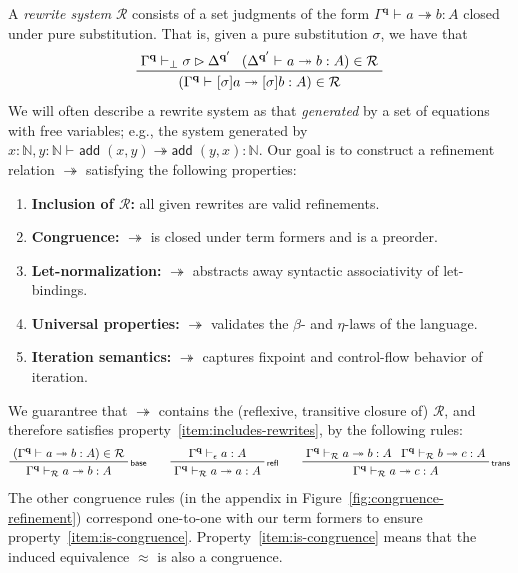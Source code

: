 \documentclass[acmsmall,screen,anonymous,review]{acmart}
\newcommand{\mc}[1]{\ensuremath{\mathcal{#1}}}
\newcommand{\mb}[1]{\ensuremath{\mathbf{#1}}}
\newcommand{\ms}[1]{\ensuremath{\mathsf{#1}}}
\newcommand{\nats}{\mathbb{N}}
\newcommand{\rle}[1]{{\scriptsize\textsf{#1}}}
\newcommand{\hasty}[4]{#1 \vdash_{#2} #3: {#4}}
\newcommand{\issubst}[4]{#1 \vdash_{#2} #3 \rhd #4}
\newcommand{\tref}{\twoheadrightarrow}
\newcommand{\tmle}[5]{#1 \vdash_{#2} #3 \tref #4 : {#5}}
\begin{document}
A \emph{rewrite system} $\mc{R}$ consists of a set judgments of the form
$\tmle{\Gamma^{\mb{q}}}{}{a}{b}{A}$ closed under pure substitution. That is, given a pure
substitution $\sigma$, we have that
\begin{equation*}
  \prftree[r]{}
    {\issubst{\Gamma^{\mb{q}}}{\bot}{\sigma}{\Delta^{\mb{q}'}}}
    {(\tmle{\Delta^{\mb{q}'}}{}{a}{b}{A}) \in \mc{R}}
    {(\tmle{\Gamma^{\mb{q}}}{}{[\sigma]a}{[\sigma]b}{A}) \in \mc{R}} 
\end{equation*}
We will often describe a rewrite system as that \emph{generated} by a set of equations with free
variables; e.g., the system generated by $\tmle{x : \nats, y : \nats}{}{\ms{add}\;(x,
y)}{\ms{add}\;(y, x)}{\nats}$. Our goal is to construct a refinement relation $\tref$ satisfying the following properties: 
\begin{enumerate}
  \item \textbf{Inclusion of $\mc{R}$:} all given rewrites are valid refinements.
  \label{item:includes-rewrites}
  \item \textbf{Congruence:} $\tref$ is closed under term formers and is a preorder.
  \label{item:is-congruence}
  \item \textbf{Let-normalization:} $\tref$ abstracts away syntactic associativity of let-bindings.
  \label{item:abstracts-syntax}
  \item \textbf{Universal properties:} $\tref$ validates the $\beta$- and $\eta$-laws of the
  language. %
  \label{item:does-computation}
  \item \textbf{Iteration semantics:} $\tref$ captures fixpoint and control-flow behavior of
  iteration.
  \label{item:does-iteration}
\end{enumerate}
We guarantree that $\tref$ contains the (reflexive, transitive closure of) $\mc{R}$, and therefore
satisfies property~\ref{item:includes-rewrites}, by the following rules:
\begin{gather*}
  \prftree[r]{\rle{base}}
    {(\tmle{\Gamma^{\mb{q}}}{}{a}{b}{A}) \in \mc{R}}
    {\tmle{\Gamma^{\mb{q}}}{\mc{R}}{a}{b}{A}} \qquad
  \prftree[r]{\rle{refl}}
    {\hasty{\Gamma^{\mb{q}}}{\epsilon}{a}{A}}
    {\tmle{\Gamma^{\mb{q}}}{\mc{R}}{a}{a}{A}}
  \qquad
  \prftree[r]{\rle{trans}}
    {\tmle{\Gamma^{\mb{q}}}{\mc{R}}{a}{b}{A}}
    {\tmle{\Gamma^{\mb{q}}}{\mc{R}}{b}{c}{A}}
    {\tmle{\Gamma^{\mb{q}}}{\mc{R}}{a}{c}{A}}
\end{gather*}
The other congruence rules (in the appendix in Figure~\ref{fig:congruence-refinement})
correspond one-to-one with our term formers to ensure property~\ref{item:is-congruence}. Property~\ref{item:is-congruence} means that the induced equivalence $\approx$ is also a congruence.
\end{document}
